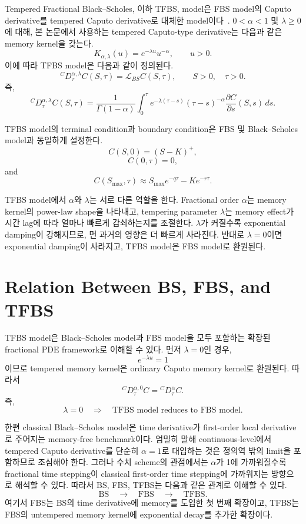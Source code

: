 \documentclass[11pt,a4paper]{report}
\begin{document}
Tempered Fractional Black--Scholes, 이하 TFBS, model은 FBS model의 Caputo derivative를 tempered Caputo derivative로 대체한 model이다~\cite{SabzikarMeerschaertChen2015}. $0<\alpha<1$ 및 $\lambda\ge0$에 대해, 본 논문에서 사용하는 tempered Caputo-type derivative는 다음과 같은 memory kernel을 갖는다.
\[
K_{\alpha,\lambda}(u)
=
e^{-\lambda u}u^{-\alpha},
\qquad u>0.
\]
이에 따라 TFBS model은 다음과 같이 정의된다.
\[
{}^C D_\tau^{\alpha,\lambda} C(S,\tau)
=
\mathcal{L}_{BS}C(S,\tau),
\qquad S>0,\quad \tau>0.
\]
즉,
\[
{}^C D_\tau^{\alpha,\lambda} C(S,\tau)
=
\frac{1}{\Gamma(1-\alpha)}
\int_0^\tau
e^{-\lambda(\tau-s)}
(\tau-s)^{-\alpha}
\frac{\partial C}{\partial s}(S,s)\,ds.
\]

TFBS model의 terminal condition과 boundary condition은 FBS 및 Black--Scholes model과 동일하게 설정한다.
\[
C(S,0)
=
(S-K)^+,
\]
\[
C(0,\tau)=0,
\]
and
\[
C(S_{\max},\tau)
\approx
S_{\max}e^{-q\tau}
-
Ke^{-r\tau}.
\]

TFBS model에서 $\alpha$와 $\lambda$는 서로 다른 역할을 한다. Fractional order $\alpha$는 memory kernel의 power-law shape을 나타내고, tempering parameter $\lambda$는 memory effect가 시간 lag에 따라 얼마나 빠르게 감쇠하는지를 조절한다. $\lambda$가 커질수록 exponential damping이 강해지므로, 먼 과거의 영향은 더 빠르게 사라진다. 반대로 $\lambda=0$이면 exponential damping이 사라지고, TFBS model은 FBS model로 환원된다.

\section{Relation Between BS, FBS, and TFBS}

TFBS model은 Black--Scholes model과 FBS model을 모두 포함하는 확장된 fractional PDE framework로 이해할 수 있다. 먼저 $\lambda=0$인 경우,
\[
e^{-\lambda u}=1
\]
이므로 tempered memory kernel은 ordinary Caputo memory kernel로 환원된다. 따라서
\[
{}^C D_\tau^{\alpha,0}C
=
{}^C D_\tau^\alpha C.
\]
즉,
\[
\lambda=0
\quad\Longrightarrow\quad
\text{TFBS model reduces to FBS model.}
\]

한편 classical Black--Scholes model은 time derivative가 first-order local derivative로 주어지는 memory-free benchmark이다. 엄밀히 말해 continuous-level에서 tempered Caputo derivative를 단순히 $\alpha=1$로 대입하는 것은 정의역 밖의 limit을 포함하므로 조심해야 한다. 그러나 수치 scheme의 관점에서는 $\alpha$가 1에 가까워질수록 fractional time stepping이 classical first-order time stepping에 가까워지는 방향으로 해석할 수 있다. 따라서 BS, FBS, TFBS는 다음과 같은 관계로 이해할 수 있다.
\[
\text{BS}
\quad\longrightarrow\quad
\text{FBS}
\quad\longrightarrow\quad
\text{TFBS}.
\]
여기서 FBS는 BS의 time derivative에 memory를 도입한 첫 번째 확장이고, TFBS는 FBS의 untempered memory kernel에 exponential decay를 추가한 확장이다.
\end{document}
